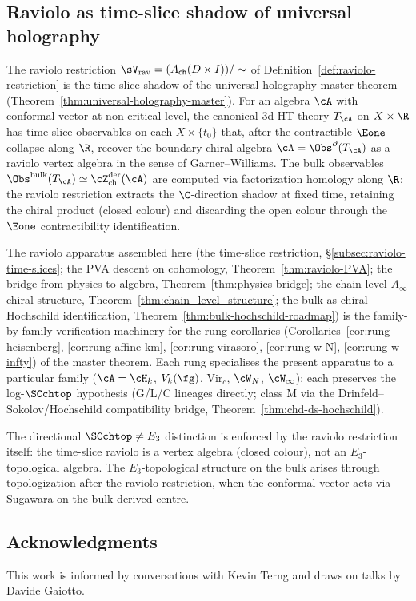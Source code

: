 \subsection{Raviolo as time-slice shadow of universal holography}
\label{subsec:raviolo-holography-anchor}

\begin{remark}
\label{rem:raviolo-holography-anchor}%
%
The raviolo restriction
$\sV_{\mathrm{rav}} = (A_{\mathsf{ch}}(D \times I)) / \sim$
of Definition~\ref{def:raviolo-restriction} is the time-slice
shadow of the universal-holography master theorem
(Theorem~\ref{thm:universal-holography-master}). For an algebra
$\cA$ with conformal vector at non-critical level, the canonical
3d HT theory $T_\cA$ on $X \times \R$ has time-slice observables
on each $X \times \{t_0\}$ that, after the contractible
$\Eone$-collapse along $\R$, recover the boundary chiral algebra
$\cA = \Obs^\partial(T_\cA)$ as a raviolo vertex algebra in the
sense of Garner--Williams. The bulk observables
$\Obs^{\mathrm{bulk}}(T_\cA) \simeq \cZ^{\mathrm{der}}_{\mathrm{ch}}(\cA)$
are computed via factorization homology along $\R$; the raviolo
restriction extracts the $\C$-direction shadow at fixed time,
retaining the chiral product (closed colour) and discarding the
open colour through the $\Eone$ contractibility identification.

The raviolo apparatus assembled here (the time-slice
restriction, \S\ref{subsec:raviolo-time-slices}; the PVA descent
on cohomology, Theorem~\ref{thm:raviolo-PVA}; the bridge from
physics to algebra, Theorem~\ref{thm:physics-bridge}; the
chain-level $A_\infty$ chiral structure,
Theorem~\ref{thm:chain_level_structure}; the bulk-as-chiral-Hochschild
identification, Theorem~\ref{thm:bulk-hochschild-roadmap}) is
the family-by-family verification machinery for the rung corollaries
(Corollaries~\ref{cor:rung-heisenberg}, \ref{cor:rung-affine-km},
\ref{cor:rung-virasoro}, \ref{cor:rung-w-N}, \ref{cor:rung-w-infty})
of the master theorem. Each rung specialises the present apparatus
to a particular family ($\cA = \cH_k$, $V_k(\fg)$, $\mathrm{Vir}_c$,
$\cW_N$, $\cW_\infty$); each preserves the log-$\SCchtop$
hypothesis (G/L/C lineages directly; class M via the
Drinfeld--Sokolov/Hochschild compatibility bridge,
Theorem~\ref{thm:chd-ds-hochschild}).

The directional $\SCchtop \neq E_3$ distinction is enforced by the
raviolo restriction itself: the time-slice raviolo is a vertex
algebra (closed colour), not an $E_3$-topological algebra. The
$E_3$-topological structure on the bulk arises through topologization
after the raviolo restriction, when the conformal vector
acts via Sugawara on the bulk derived centre.
\end{remark}

\subsection{Acknowledgments}

This work is informed by conversations with Kevin Terng and draws on talks by Davide Gaiotto.
